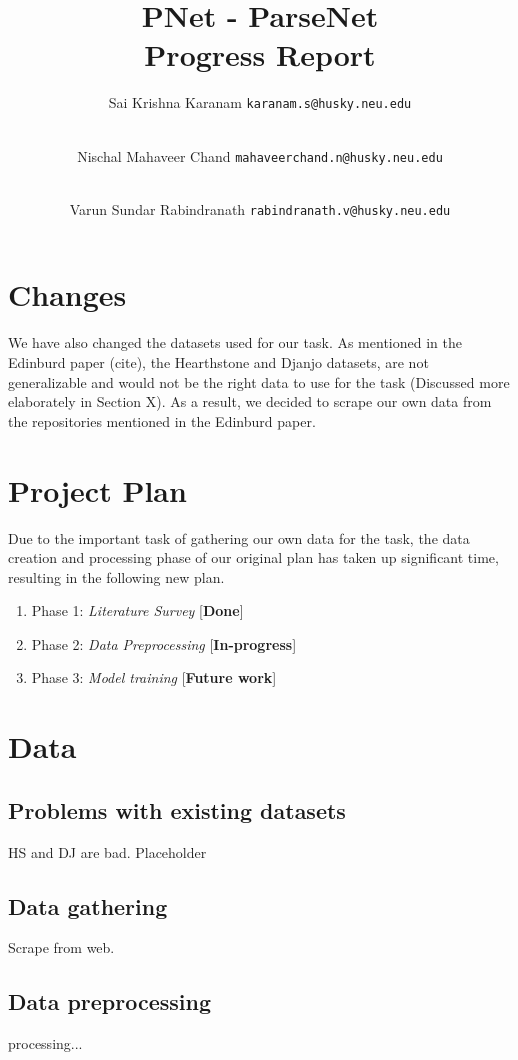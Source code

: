 \documentclass{IEEEtran}
\title{\textbf{PNet - ParseNet \\ \large{Progress Report}}}
\author{
    Sai Krishna Karanam 
    \texttt{karanam.s@husky.neu.edu}
    \and \\
    Nischal Mahaveer Chand 
    \texttt{mahaveerchand.n@husky.neu.edu}
    \and \\
    Varun Sundar Rabindranath 
    \texttt{rabindranath.v@husky.neu.edu}
}
\date{}
\begin{document}
    \maketitle

    \section{Changes}

    We have also changed the datasets used for our task. As mentioned in the 
    Edinburd paper (cite), the Hearthstone and Djanjo datasets, are not generalizable and
    would not be the right data to use for the task (Discussed more elaborately in Section
    X). As a result, we decided to scrape our own data from the repositories mentioned 
    in the Edinburd paper.

    \section{Project Plan}
    Due to the important task of gathering our own data for the task, the data creation and 
    processing phase of our original plan has taken up significant time, resulting in the
    following new plan.
    \begin{enumerate}
        \item Phase 1: \textit{Literature Survey} \hfill [\textbf{Done}]
        \item Phase 2: \textit{Data Preprocessing} \hfill [\textbf{In-progress}]
        \item Phase 3: \textit{Model training} \hfill [\textbf{Future work}]
    \end{enumerate}

    \section{Data}

      \subsection{Problems with existing datasets}HS and DJ are bad. Placeholder

      \subsection{Data gathering} Scrape from web.

      \subsection{Data preprocessing} processing...
\end{document}
